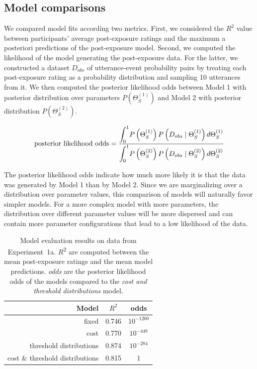 \documentclass[lucida,biblatex]{sp} %
\begin{document}
\subsection{Model comparisons}

We compared model fits according two metrics. First, we considered the $R^2$ value between participants' average post-exposure ratings and the maximum a posteriori predictions of the post-exposure model. Second, we computed the likelihood of the model generating the post-exposure data. For the latter, we constructed a dataset $D_{obs}$ of utterance-event probability pairs by treating each post-exposure rating as a probability distribution and sampling 10 utterances from it. We then computed the posterior likelihood odds between Model 1 with posterior distribution over parameters $P(\Theta_{S}^{(1)})$ and Model 2 with posterior distribution $P(\Theta_{S}^{(2)})$.

$$\mbox{posterior likelihood odds} = \frac{\mathlarger{\int_0^1} {P\left(\Theta_{S}^{(1)}\right) P\left(D_{obs} \mid \Theta_{S}^{(1)} \right) d   \Theta_{S}^{(1)}}}{\mathlarger{\int_0^1} P\left(\Theta_{S}^{(2)}\right) P\left(D_{obs} \mid \Theta_{S}^{(2)}\right)d   \Theta_{S}^{(2)} }$$
 
\noindent The posterior likelihood odds indicate how much more likely it is that the data was generated by Model 1 than by Model 2. Since we are marginalizing over a distribution over parameter values, this comparison of models will naturally
favor simpler models. For a more complex model with more parameters, the distribution over different parameter values will be more dispersed and can contain more parameter configurations that lead to a low likelihood of the data.

\begin{table}
\center
\begin{tabular}{r | c | c  }
Model & $R^2$ &   odds  \\ \midrule
fixed & 0.746 & $10^{-1200}$    \\
cost & 0.770 &  $10^{-448}$    \\
threshold distributions & 0.874 &  $10^{-284}$   \\
cost \& threshold distributions & 0.815 & 1 \\
\end{tabular}
\caption{Model evaluation results on data from Experiment~1a. $R$\textsuperscript{$2$} are computed between  the mean post-exposure ratings and the mean model predictions. \textit{odds} are the posterior likelihood odds of the models compared to the \textit{cost and threshold distributions} model. \label{tbl:model-comparison}}
\end{table}
\end{document}

